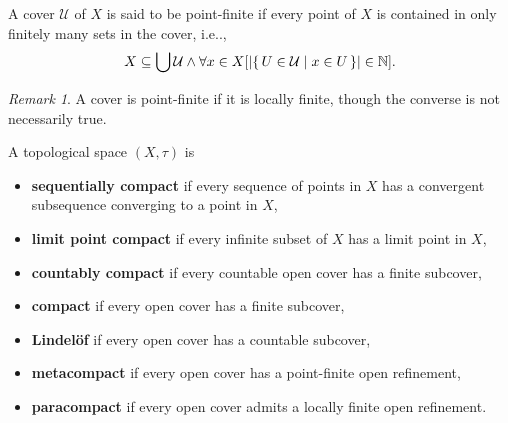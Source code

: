 \documentclass[12pt, letterpaper]{article}
\makeatletter
\newcommand{\nat}{\mathbb{N}}
\newcommand\ie{i.e\@ifnextchar.{}{.\@}}
\newcommand{\card}[1]{\left\lvert #1 \right\rvert}
\theoremstyle{definition}
\theoremstyle{remark}
\newtheorem*{rem*}{Remark}
\theoremstyle{definition}
\theoremstyle{plain}
\numberwithin{equation}{section}
\makeatother
\begin{document}
	\begin{def*}
		A cover $\mathcal{U}$ of $X$ is said to be point-finite if every point of $X$ is contained in only finitely many sets in the cover,
		\ie,
		\[ X\subseteq \bigcup\mathcal{U} \land \forall x \in X[\card{\set{U\in\mathcal{U}|x\in U}}\in\nat] .\]
	\end{def*}
	\begin{rem*}
		A cover is point-finite if it is locally finite, though the converse is not necessarily true.
	\end{rem*}
	
	\begin{def*}
		A topological space $(X,\tau)$ is
		\begin{itemize}
			\item \textbf{sequentially compact} if every sequence of points in $X$ has a convergent subsequence converging to a point in $X$,
			\item \textbf{limit point compact} if every infinite subset of $X$ has a limit point in $X$,
			\item \textbf{countably compact} if every countable open cover has a finite subcover,
			
			\item \textbf{compact}
			if every open cover has a finite subcover,
			\item \textbf{Lindelöf}
			if every open cover has a countable subcover,
			\item \textbf{metacompact}
			if every open cover has a point-finite open refinement,
			\item \textbf{paracompact}
			if every open cover admits a locally finite open refinement.
		\end{itemize}
	\end{def*}
\end{document}
